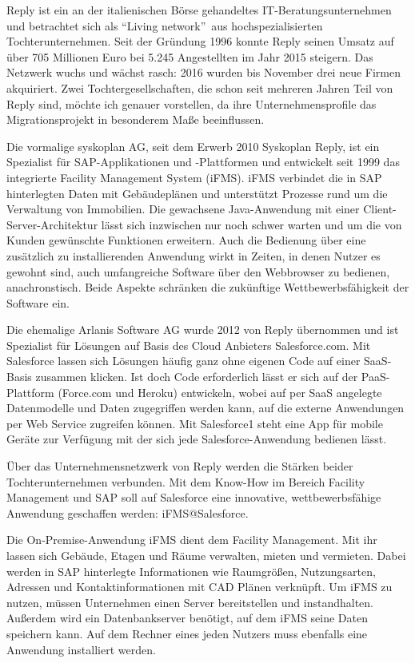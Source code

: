 

Reply ist ein an der italienischen Börse gehandeltes 
IT-Beratungsunternehmen und betrachtet sich als "`Living network"'\ aus 
hochspezialisierten Tochterunternehmen. Seit der Gründung 1996 konnte Reply 
seinen Umsatz auf über 705 Millionen Euro bei 5.245 Angestellten im Jahr 2015 
steigern. Das Netzwerk wuchs und wächst rasch: 2016 wurden bis November drei 
neue Firmen akquiriert. Zwei Tochtergesellschaften, die schon seit mehreren 
Jahren Teil von Reply sind, 
möchte ich genauer vorstellen, da ihre Unternehmensprofile das 
Migrationsprojekt in besonderem Maße beeinflussen.

Die vormalige syskoplan AG, seit dem Erwerb 2010  
Syskoplan Reply, ist ein Spezialist für SAP-Applikationen und 
-Plattformen  und entwickelt seit 1999 das 
integrierte Facility Management System (iFMS). iFMS verbindet die in SAP 
hinterlegten Daten mit Gebäudeplänen und unterstützt Prozesse rund um die 
Verwaltung von Immobilien. Die gewachsene 
Java-Anwendung mit einer Client-Server-Architektur lässt sich inzwischen nur 
noch schwer warten und um die von Kunden gewünschte Funktionen erweitern. Auch die Bedienung 
über 
eine zusätzlich zu installierenden Anwendung wirkt in Zeiten, in denen Nutzer 
es gewohnt sind, auch umfangreiche Software über den Webbrowser zu bedienen, 
anachronstisch. Beide Aspekte schränken die zukünftige
Wettbewerbsfähigkeit der Software ein. 

Die ehemalige Arlanis Software AG wurde 2012 von Reply übernommen und ist 
Spezialist für Lösungen auf Basis des Cloud Anbieters Salesforce.com. Mit 
Salesforce lassen sich Lösungen häufig ganz ohne eigenen Code auf einer 
SaaS-Basis zusammen klicken. Ist doch Code erforderlich lässt er sich auf der 
PaaS-Plattform (Force.com und Heroku) entwickeln, wobei auf per SaaS angelegte 
Datenmodelle und Daten zugegriffen werden kann, auf die externe Anwendungen per 
Web Service zugreifen können. Mit Salesforce1 steht eine App für mobile Geräte 
zur Verfügung mit der sich jede Salesforce-Anwendung bedienen lässt.

Über das Unternehmensnetzwerk von Reply werden die Stärken beider 
Tochterunternehmen verbunden. Mit dem Know-How im Bereich Facility 
Management und SAP soll auf Salesforce eine innovative, wettbewerbsfähige 
Anwendung geschaffen werden: iFMS@Salesforce.

Die On-Premise-Anwendung iFMS dient dem Facility Management. Mit ihr lassen 
sich Gebäude, Etagen und Räume verwalten, mieten und vermieten. Dabei werden in 
SAP hinterlegte Informationen wie Raumgrößen, Nutzungsarten, Adressen und 
Kontaktinformationen mit CAD Plänen verknüpft. Um iFMS zu nutzen, müssen 
Unternehmen einen Server bereitstellen und instandhalten. Außerdem wird ein Datenbankserver benötigt, auf dem iFMS seine 
Daten speichern kann. Auf dem Rechner eines jeden Nutzers muss ebenfalls eine 
Anwendung installiert werden. 

